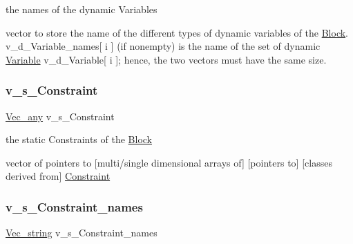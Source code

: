 the names of the dynamic Variables 

vector to store the name of the different types of dynamic variables of the \mbox{\hyperlink{class_s_m_spp__di__unipi__it_1_1_block}{Block}}. v\+\_\+d\+\_\+\+Variable\+\_\+names\mbox{[} i \mbox{]} (if nonempty) is the name of the set of dynamic \mbox{\hyperlink{class_s_m_spp__di__unipi__it_1_1_variable}{Variable}} v\+\_\+d\+\_\+\+Variable\mbox{[} i \mbox{]}; hence, the two vectors must have the same size. \mbox{\label{class_s_m_spp__di__unipi__it_1_1_block_a6cbbe84709e83e48d4faab3ed8a8456a}} 
\subsubsection{\texorpdfstring{v\+\_\+s\+\_\+\+Constraint}{v\_s\_Constraint}}
{\footnotesize\ttfamily \mbox{\hyperlink{group___s_m_s__types_ga58ded0963812566c064a5177b2f84c28}{Vec\+\_\+any}} v\+\_\+s\+\_\+\+Constraint\hspace{0.3cm}{\ttfamily [private]}}



the static Constraints of the \mbox{\hyperlink{class_s_m_spp__di__unipi__it_1_1_block}{Block}} 

vector of pointers to \mbox{[}multi/single dimensional arrays of\mbox{]} \mbox{[}pointers to\mbox{]} \mbox{[}classes derived from\mbox{]} \mbox{\hyperlink{class_s_m_spp__di__unipi__it_1_1_constraint}{Constraint}} \mbox{\label{class_s_m_spp__di__unipi__it_1_1_block_a15b7c4c4c3e4e5d61641aeec9171b320}} 
\subsubsection{\texorpdfstring{v\+\_\+s\+\_\+\+Constraint\+\_\+names}{v\_s\_Constraint\_names}}
{\footnotesize\ttfamily \mbox{\hyperlink{group___s_m_s__types_ga36068d46bc6e7ba661efe0093c7a8beb}{Vec\+\_\+string}} v\+\_\+s\+\_\+\+Constraint\+\_\+names\hspace{0.3cm}{\ttfamily [protected]}}



